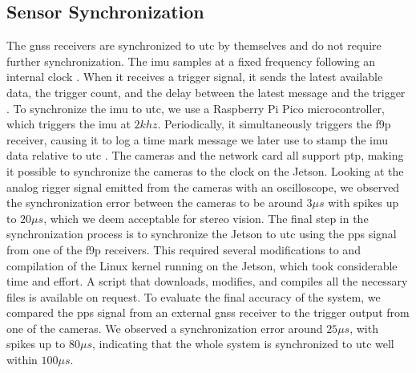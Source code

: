 \subsection{Sensor Synchronization}
The \gls{gnss} receivers are synchronized to \gls{utc} by themselves and do not require further synchronization.
The \gls{imu} samples at a fixed frequency following an internal clock \cite{safranSTIM300Datasheet}.
When it receives a trigger signal, it sends the latest available data, the trigger count, and the delay between the latest message and the trigger \cite{safranSTIM300Datasheet}.
To synchronize the \gls{imu} to \gls{utc}, we use a Raspberry Pi Pico microcontroller, which triggers the \gls{imu} at $2khz$.
Periodically, it simultaneously triggers the \gls{f9p} receiver, causing it to log a time mark message we later use to stamp the \gls{imu} data relative to \gls{utc} \cite[190]{u-bloxZEDF9PInterfaceDescription}.
The cameras and the network card all support \gls{ptp}, making it possible to synchronize the cameras to the clock on the Jetson.
Looking at the analog rigger signal emitted from the cameras with an oscilloscope, we observed the synchronization error between the cameras to be around $3\mu s$ with spikes up to $20\mu s$, which we deem acceptable for stereo vision.
The final step in the synchronization process is to synchronize the Jetson to \gls{utc} using the \gls{pps} signal from one of the \gls{f9p} receivers.
This required several modifications to and compilation of the Linux kernel running on the Jetson, which took considerable time and effort.
A script that downloads, modifies, and compiles all the necessary files is available on request.
To evaluate the final accuracy of the system, we compared the \gls{pps} signal from an external \gls{gnss} receiver to the trigger output from one of the cameras. 
We observed a synchronization error around $25\mu s$, with spikes up to $80\mu s$, indicating that the whole system is synchronized to \gls{utc} well within $100\mu s$.







